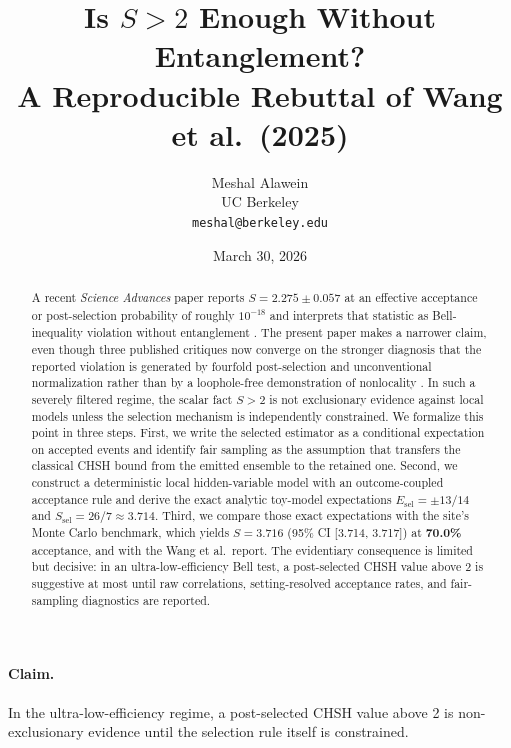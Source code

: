 \documentclass[11pt]{article}
\title{Is $S > 2$ Enough Without Entanglement?\\A Reproducible Rebuttal of Wang et al.~(2025)}
\author{Meshal Alawein\\UC Berkeley\\\texttt{meshal@berkeley.edu}}
\date{March 30, 2026}
\newcommand{\sel}{\mathrm{sel}}
\begin{document}
\maketitle

\pagestyle{fancy}
\fancyhf{}
\fancyfoot[C]{\thepage}
\renewcommand{\headrulewidth}{0.3pt}
\renewcommand{\footrulewidth}{0pt}

\begin{abstract}
A recent \emph{Science Advances} paper reports \textbf{$S = 2.275 \pm 0.057$} at an effective acceptance or post-selection probability of roughly \textbf{$10^{-18}$} and interprets that statistic as Bell-inequality violation without entanglement \cite{wang2025}. The present paper makes a narrower claim, even though three published critiques now converge on the stronger diagnosis that the reported violation is generated by fourfold post-selection and unconventional normalization rather than by a loophole-free demonstration of nonlocality \cite{wharton2025,wojcik2025,cieslinski2025}. In such a severely filtered regime, the scalar fact $S > 2$ is not exclusionary evidence against local models unless the selection mechanism is independently constrained. We formalize this point in three steps. First, we write the selected estimator as a conditional expectation on accepted events and identify fair sampling as the assumption that transfers the classical CHSH bound from the emitted ensemble to the retained one. Second, we construct a deterministic local hidden-variable model with an outcome-coupled acceptance rule and derive the exact analytic toy-model expectations $E_{\sel} = \pm 13/14$ and $S_{\sel} = 26/7 \approx 3.714$. Third, we compare those exact expectations with the site's Monte Carlo benchmark, which yields \textbf{$S = 3.716$} (95\% CI [3.714, 3.717]) at \textbf{70.0\%} acceptance, and with the Wang et al.~report. The evidentiary consequence is limited but decisive: in an ultra-low-efficiency Bell test, a post-selected CHSH value above 2 is suggestive at most until raw correlations, setting-resolved acceptance rates, and fair-sampling diagnostics are reported.
\end{abstract}

\paragraph{Claim.}
In the ultra-low-efficiency regime, a post-selected CHSH value above 2 is non-exclusionary evidence until the selection rule itself is constrained.
\end{document}
